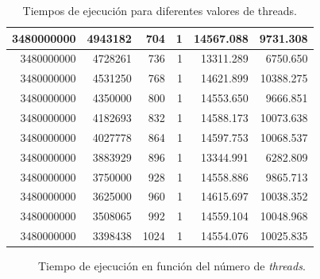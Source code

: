 \documentclass{article}
\begin{document}
\begin{table}[H]
\begin{adjustbox}{width=\textwidth, keepaspectratio}
\begin{tabular}{|r|r|r|r|r|r|}
						3480000000 & 4943182 & 704 & 1 & 14567.088 & 9731.308 \\ \hline
						3480000000 & 4728261 & 736 & 1 & 13311.289 & 6750.650 \\ \hline
						3480000000 & 4531250 & 768 & 1 & 14621.899 & 10388.275 \\ \hline
						3480000000 & 4350000 & 800 & 1 & 14553.650 & 9666.851 \\ \hline
						3480000000 & 4182693 & 832 & 1 & 14588.173 & 10073.638 \\ \hline
						3480000000 & 4027778 & 864 & 1 & 14597.753 & 10068.537 \\ \hline
						3480000000 & 3883929 & 896 & 1 & 13344.991 & 6282.809 \\ \hline
						3480000000 & 3750000 & 928 & 1 & 14558.886 & 9865.713 \\ \hline
						3480000000 & 3625000 & 960 & 1 & 14615.697 & 10038.352 \\ \hline
						3480000000 & 3508065 & 992 & 1 & 14559.104 & 10048.968 \\ \hline \hline
						3480000000 & 3398438 & 1024 & 1 & 14554.076 & 10025.835 \\ \hline
					\end{tabular}
				\end{adjustbox}
				\caption{Tiempos de ejecución para diferentes valores de threads.}
				\label{tab:resultados2}
			\end{table}

			\begin{figure}[H]
				\centering
				\caption{Tiempo de ejecución en función del número de \textit{threads}.}
				\label{fig:threads_vs_time_2}
			\end{figure}
\end{document}
